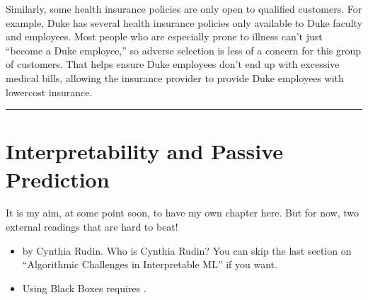 \documentclass[letterpaper,10pt,english]{jupyterBook}
\begin{document}
\sphinxAtStartPar
Similarly, some health insurance policies are only open to qualified customers. For example, Duke has several health insurance policies only available to Duke faculty and employees. Most people who are especially prone to illness can’t just “become a Duke employee,” so adverse selection is less of a concern for this group of customers. That helps ensure Duke employees don’t end up with excessive medical bills, allowing the insurance provider to provide Duke employees with lower\sphinxhyphen{}cost insurance.


\bigskip\hrule\bigskip


\sphinxstepscope


\chapter{Interpretability and Passive Prediction}
\label{\detokenize{30_questions/32_passive_interpretable_models:interpretability-and-passive-prediction}}\label{\detokenize{30_questions/32_passive_interpretable_models::doc}}
\sphinxAtStartPar
It is my aim, at some point soon, to have my own chapter here. But for now, two external readings that are hard to beat!
\begin{itemize}
\item {} 
\sphinxAtStartPar
{} by Cynthia Rudin. Who is Cynthia Rudin?  You can skip the last section on “Algorithmic Challenges in Interpretable ML” if you want.

\item {} 
\sphinxAtStartPar
Using Black Boxes requires .

\end{itemize}



\sphinxstepscope
\end{document}
